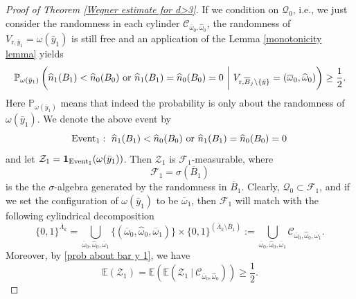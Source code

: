 \documentclass[11pt,reqno,UTF8,twoside]{amsart}
\newcommand{\E}{\mathbb{E}}
\newcommand{\event}{{\rm Event}}
\newcommand{\barLambda}{\overline{\Lambda}}
\renewcommand{\P}{\mathbb{P}}
\newcommand{\baromega}{\overline{\omega}}
\newcommand{\hatomega}{\widehat{\omega}}
\newcommand{\mcC}{\mathcal{C}}
\newcommand{\mcF}{\mathcal{F}}
\newcommand{\mcQ}{\mathcal{Q}}
\newcommand{\mcZ}{\mathcal{Z}}
\newcommand{\whn}{\widehat{n}}
\newcommand{\barB}{\overline{B}}
\theoremstyle{definition}
\numberwithin{equation}{section}
\begin{document}
\begin{proof}[Proof of Theorem \ref{Wegner estimate for d>3}]
If we condition on $\mcQ_0$, i.e.,  we just consider the randomness in each cylinder $\mcC_{\baromega_0,\hatomega_0}$, the randomness of $V_{\text{r},\bar{y}_1}=\omega(\bar{y}_1)$ is still free and an application of the Lemma \ref{monotonicity lemma} yields 
\begin{equation}\label{prob about bar y 1}
   \P_{\omega(\bar{y}_1)}    \left(\whn_{1}(B_{1}) <\whn_{0}(B_{0}) \ {\rm or}\ \whn_{1}(B_{1}) =\whn_{0}(B_{0})=0 \  \bigg| \ V_{\text{r},\barB_{j}\setminus \{\bar{y}\} }=(\baromega_0,\hatomega_0) \right)\geq \frac{1}{2}.
\end{equation}
Here $\P_{\omega(\bar{y}_1)}$ means that indeed the probability is only about the randomness of $\omega(\bar{y}_1)$. We denote the above event by 
\begin{equation*}
   \event_1: \ \whn_{1}(B_{1}) <\whn_{0}(B_{0}) \ {\rm or}\ \whn_{1}(B_{1}) =\whn_{0}(B_{0})=0 \,
\end{equation*}
and let $\mcZ_1=\mathbf{1}_{\event_1}(\omega(\bar{y}_1))$. Then $\mcZ_1$ is $\mcF_1$-measurable, where
\[\mcF_1=\sigma(\barB_1)\] 
is the the $\sigma$-algebra generated by the randomness in $\barB_1$. Clearly, $\mcQ_0\subset \mcF_1$, and if we set the configuration of $\omega(\bar{y}_1)$ to be $\baromega_1$, then $\mcF_1$ will match with the following cylindrical decomposition 
\[ \{0,1\}^{\barLambda_k}=\bigcup_{\baromega_0,\hatomega_0,\baromega_1} \{(\baromega_0,\hatomega_0,\baromega_1)\}\times \{0,1\}^{(\barLambda_k\setminus \barB_1)} :=\bigcup_{\baromega_0,\hatomega_0,\baromega_1}\mcC_{\baromega_0,\hatomega_0,\baromega_1}. \]
Moreover, by \eqref{prob about bar y 1}, we have 
\begin{equation}\label{expectation 1}
  \E(\mcZ_1)=\E(\E(\mcZ_1 \ | \ \mcC_{\baromega_0,\hatomega_0})) \geq \frac{1}{2}.
\end{equation}


\end{proof}
\end{document}
